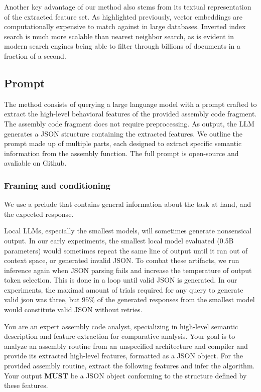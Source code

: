 Another key advantage of our method also stems from its textual representation of the extracted feature set. As highlighted
previously, vector embeddings are computationally expensive to match against in large databases. Inverted index search is much
more scalable than nearest neighbor search, as is evident in modern search engines being able to filter through billions of documents
in a fraction of a second.

\subsection{Prompt}

The method consists of querying a large language model with a prompt crafted to extract the high-level behavioral features of
the provided assembly code fragment. The assembly code fragment does not require preprocessing. As output, the LLM generates a JSON
structure containing the extracted features. We outline the prompt made up of multiple parts, each designed to
extract specific semantic information from the assembly function. The full prompt is open-source and avaliable on Github.

\subsubsection{Framing and conditioning}

We use a prelude that contains general information about the task at hand, and the expected response.

Local LLMs, especially the smallest models, will sometimes generate nonsensical output. In our early experiments, the smallest local model
evaluated (0.5B parameters) would sometimes repeat the same line of output until it ran out of context space, or generated invalid JSON.
To combat these artifacts, we run inference again when JSON parsing fails and increase the temperature of output token
selection. This is done in a loop until valid JSON is generated. In our experiments, the maximal amount of trials required
for any query to generate valid json was three, but \(95\%\) of the generated responses from the smallest model would constitute
valid JSON without retries.

\begin{tcolorbox}[title={Prompt preamble}]
You are an expert assembly code analyst, specializing in high-level semantic description and feature extraction for comparative
analysis. Your goal is to analyze an assembly routine from an unspecified architecture and compiler and provide its extracted
high-level features, formatted as a JSON object. For the provided assembly routine, extract the following features and infer the
algorithm. Your output \textbf{MUST} be a JSON object conforming to the structure defined by these features.
\end{tcolorbox}

